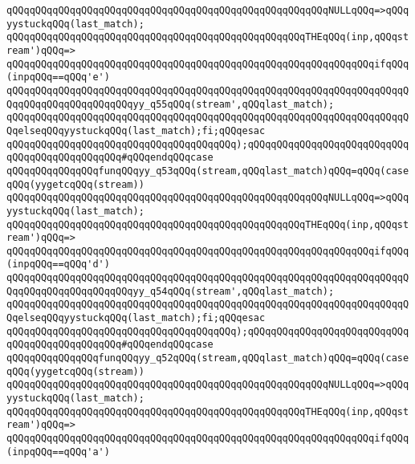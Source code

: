\verb|qQQqqQQqqQQqqQQqqQQqqQQqqQQqqQQqqQQqqQQqqQQqqQQqqQQqqQQqNULLqQQq=>qQQqyystuckqQQq(last_match);|\newline
\verb|qQQqqQQqqQQqqQQqqQQqqQQqqQQqqQQqqQQqqQQqqQQqqQQqqQQqTHEqQQq(inp,qQQqstream')qQQq=>|\newline
\verb|qQQqqQQqqQQqqQQqqQQqqQQqqQQqqQQqqQQqqQQqqQQqqQQqqQQqqQQqqQQqqQQqifqQQq(inpqQQq==qQQq'e')|\newline
\verb|qQQqqQQqqQQqqQQqqQQqqQQqqQQqqQQqqQQqqQQqqQQqqQQqqQQqqQQqqQQqqQQqqQQqqQQqqQQqqQQqqQQqqQQqqQQqyy_q55qQQq(stream',qQQqlast_match);|\newline
\verb|qQQqqQQqqQQqqQQqqQQqqQQqqQQqqQQqqQQqqQQqqQQqqQQqqQQqqQQqqQQqqQQqqQQqqQQqelseqQQqyystuckqQQq(last_match);fi;qQQqesac|\newline
\verb|qQQqqQQqqQQqqQQqqQQqqQQqqQQqqQQqqQQqqQQq);qQQqqQQqqQQqqQQqqQQqqQQqqQQqqQQqqQQqqQQqqQQqqQQq#qQQqendqQQqcase|\newline
\verb|qQQqqQQqqQQqqQQqfunqQQqyy_q53qQQq(stream,qQQqlast_match)qQQq=qQQq(caseqQQq(yygetcqQQq(stream))|\newline
\verb|qQQqqQQqqQQqqQQqqQQqqQQqqQQqqQQqqQQqqQQqqQQqqQQqqQQqqQQqNULLqQQq=>qQQqyystuckqQQq(last_match);|\newline
\verb|qQQqqQQqqQQqqQQqqQQqqQQqqQQqqQQqqQQqqQQqqQQqqQQqqQQqTHEqQQq(inp,qQQqstream')qQQq=>|\newline
\verb|qQQqqQQqqQQqqQQqqQQqqQQqqQQqqQQqqQQqqQQqqQQqqQQqqQQqqQQqqQQqqQQqifqQQq(inpqQQq==qQQq'd')|\newline
\verb|qQQqqQQqqQQqqQQqqQQqqQQqqQQqqQQqqQQqqQQqqQQqqQQqqQQqqQQqqQQqqQQqqQQqqQQqqQQqqQQqqQQqqQQqqQQqyy_q54qQQq(stream',qQQqlast_match);|\newline
\verb|qQQqqQQqqQQqqQQqqQQqqQQqqQQqqQQqqQQqqQQqqQQqqQQqqQQqqQQqqQQqqQQqqQQqqQQqelseqQQqyystuckqQQq(last_match);fi;qQQqesac|\newline
\verb|qQQqqQQqqQQqqQQqqQQqqQQqqQQqqQQqqQQqqQQq);qQQqqQQqqQQqqQQqqQQqqQQqqQQqqQQqqQQqqQQqqQQqqQQq#qQQqendqQQqcase|\newline
\verb|qQQqqQQqqQQqqQQqfunqQQqyy_q52qQQq(stream,qQQqlast_match)qQQq=qQQq(caseqQQq(yygetcqQQq(stream))|\newline
\verb|qQQqqQQqqQQqqQQqqQQqqQQqqQQqqQQqqQQqqQQqqQQqqQQqqQQqqQQqNULLqQQq=>qQQqyystuckqQQq(last_match);|\newline
\verb|qQQqqQQqqQQqqQQqqQQqqQQqqQQqqQQqqQQqqQQqqQQqqQQqqQQqTHEqQQq(inp,qQQqstream')qQQq=>|\newline
\verb|qQQqqQQqqQQqqQQqqQQqqQQqqQQqqQQqqQQqqQQqqQQqqQQqqQQqqQQqqQQqqQQqifqQQq(inpqQQq==qQQq'a')|\newline
